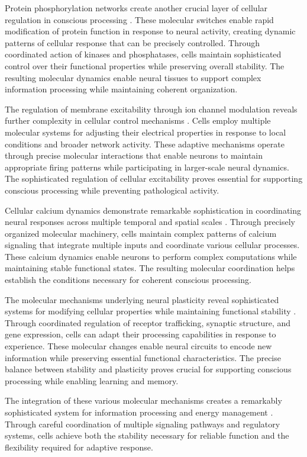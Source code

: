 \begin{refsection}
Protein phosphorylation networks create another crucial layer of cellular regulation in conscious processing \cite{Lane2018}. These molecular switches enable rapid modification of protein function in response to neural activity, creating dynamic patterns of cellular response that can be precisely controlled. Through coordinated action of kinases and phosphatases, cells maintain sophisticated control over their functional properties while preserving overall stability. The resulting molecular dynamics enable neural tissues to support complex information processing while maintaining coherent organization.

The regulation of membrane excitability through ion channel modulation reveals further complexity in cellular control mechanisms \cite{Marder2012}. Cells employ multiple molecular systems for adjusting their electrical properties in response to local conditions and broader network activity. These adaptive mechanisms operate through precise molecular interactions that enable neurons to maintain appropriate firing patterns while participating in larger-scale neural dynamics. The sophisticated regulation of cellular excitability proves essential for supporting conscious processing while preventing pathological activity.

Cellular calcium dynamics demonstrate remarkable sophistication in coordinating neural responses across multiple temporal and spatial scales \cite{Reese2016}. Through precisely organized molecular machinery, cells maintain complex patterns of calcium signaling that integrate multiple inputs and coordinate various cellular processes. These calcium dynamics enable neurons to perform complex computations while maintaining stable functional states. The resulting molecular coordination helps establish the conditions necessary for coherent conscious processing.

The molecular mechanisms underlying neural plasticity reveal sophisticated systems for modifying cellular properties while maintaining functional stability \cite{Takeuchi2014}. Through coordinated regulation of receptor trafficking, synaptic structure, and gene expression, cells can adapt their processing capabilities in response to experience. These molecular changes enable neural circuits to encode new information while preserving essential functional characteristics. The precise balance between stability and plasticity proves crucial for supporting conscious processing while enabling learning and memory.

The integration of these various molecular mechanisms creates a remarkably sophisticated system for information processing and energy management \cite{Wang2020}. Through careful coordination of multiple signaling pathways and regulatory systems, cells achieve both the stability necessary for reliable function and the flexibility required for adaptive response.


\end{refsection}
